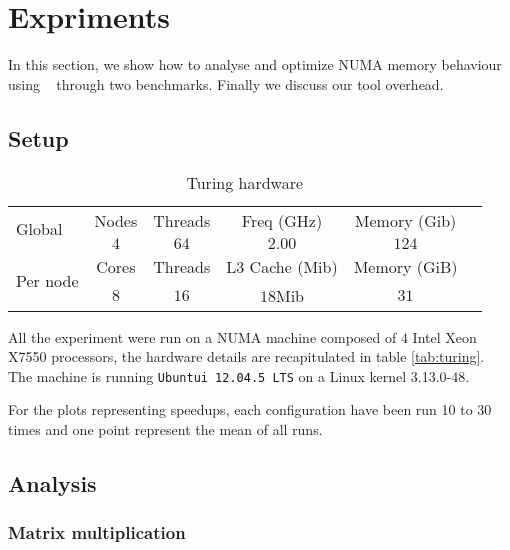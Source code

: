 
\section{Expriments}
\label{sec:expe}
In this section, we show how to analyse and optimize NUMA memory behaviour using
\TABARNAC~ through two benchmarks. Finally we discuss our tool overhead.

\subsection{Setup}
\label{sec:expe-setup}

\begin{table}
    \centering
        \begin{tabular}{|l|c|c|c|c|c|}
            \hline
            \multirow{2}{*}{Global} & Nodes & Threads & Freq (GHz) & Memory (Gib) \\
            \cline{2-5}
                & $4$   & $64$ & $2.00$ & $124$ \\
            \hline
           \multirow{2}{*}{Per node} & Cores & Threads & L3 Cache (Mib) & Memory (GiB) \\
            \cline{2-5}
            & $8$ & $16$ & $18$Mib & $31$  \\
            \hline
        \end{tabular}
    \caption{Turing hardware}
    \label{tab:machines}
\end{table}

All the experiment were run on a NUMA machine composed of $4$ Intel Xeon X7550
processors, the hardware details are recapitulated in table \ref{tab:turing}.
The machine is running \texttt{Ubuntui 12.04.5 LTS} on a Linux kernel 3.13.0-48.

For the plots representing speedups, each configuration have been run 10 to 30
times and one point represent the mean of all runs.

\subsection{Analysis}
\label{sec:expe-analysis}

\subsubsection{Matrix multiplication}
\label{sec:exp-mat}

